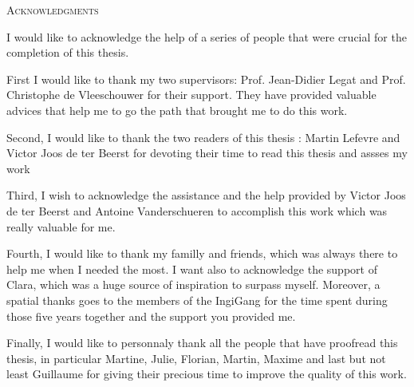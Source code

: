 \vspace*{\fill}
\begin{center}
    \huge{\textsc{Acknowledgments}}
    \end{center}
    
    I would like to acknowledge the help of a series of people that were crucial for the completion of this thesis.
    
    First I would like to thank my two supervisors: Prof. Jean-Didier Legat and Prof. Christophe de Vleeschouwer for their support. They have provided valuable advices that help me to go the path that brought me to do this work. 
    
    Second, I would like to thank the two readers of this thesis : Martin Lefevre and Victor Joos de ter Beerst for devoting their time to read this thesis and assses my work
    
    Third, I wish to acknowledge the assistance and the help provided by Victor Joos de ter Beerst and Antoine Vanderschueren to accomplish this work which was really valuable for me.
    
    Fourth, I would like to thank my familly and friends, which was always there to help me when I needed the most. I want also to acknowledge the support of Clara, which was a huge source of inspiration to surpass myself. Moreover, a spatial thanks goes to the members of the IngiGang for the time spent during those five years together and the support you provided me.
    
    Finally, I would like to personnaly thank all the people that have proofread this thesis, in particular Martine, Julie, Florian, Martin, Maxime and last but not least Guillaume for giving their precious time to improve the quality of this work. 
\vspace*{\fill}
\afterpage{\blankpage}
\newpage
